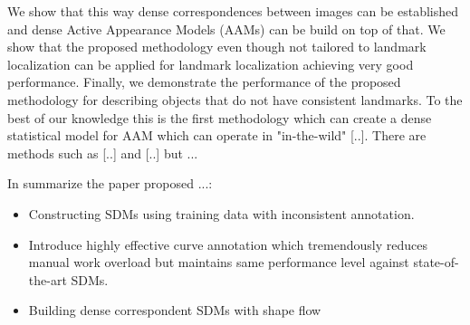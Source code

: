 We show that this way dense correspondences between images can be established and dense Active Appearance Models (AAMs) can be build on top of that. We show that the proposed methodology even though not tailored to landmark localization can be applied for landmark localization achieving very good performance. Finally, we demonstrate the performance of the proposed methodology for describing objects that do not have consistent landmarks. To the best of our knowledge this is the first methodology which can create a dense statistical model for AAM which can operate in "in-the-wild" [..]. There are methods such as [..] and [..] but ...  


In summarize the paper proposed ...:
\begin{itemize}
  \item Constructing SDMs using training data with inconsistent annotation.
  \item Introduce highly effective curve annotation which tremendously reduces manual work overload but maintains same performance level against state-of-the-art SDMs.
  \item Building dense correspondent SDMs with shape flow
\end{itemize}







